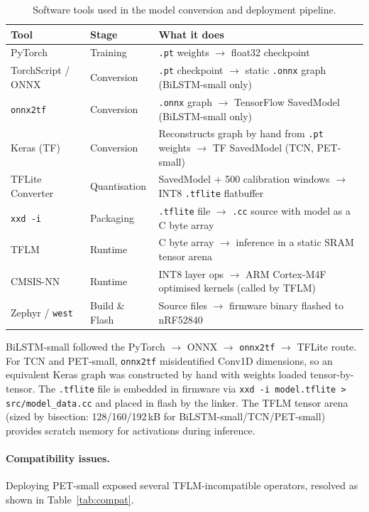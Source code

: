 \documentclass[11pt]{article}
\begin{document}
\begin{table}[H]
\centering
\caption{Software tools used in the model conversion and deployment pipeline.}
\label{tab:tools}
\small
\begin{tabular}{p{2.8cm}p{2.5cm}p{8cm}}
\toprule
\textbf{Tool} & \textbf{Stage} & \textbf{What it does} \\
\midrule
PyTorch & Training & \texttt{.pt} weights $\to$ float32 checkpoint \\
TorchScript / ONNX & Conversion & \texttt{.pt} checkpoint $\to$ static \texttt{.onnx} graph (BiLSTM-small only) \\
\texttt{onnx2tf} & Conversion & \texttt{.onnx} graph $\to$ TensorFlow SavedModel (BiLSTM-small only) \\
Keras (TF) & Conversion & Reconstructs graph by hand from \texttt{.pt} weights $\to$ TF SavedModel (TCN, PET-small) \\
TFLite Converter & Quantisation & SavedModel + 500 calibration windows $\to$ INT8 \texttt{.tflite} flatbuffer \\
\texttt{xxd -i} & Packaging & \texttt{.tflite} file $\to$ \texttt{.cc} source with model as a C byte array \\
TFLM & Runtime & C byte array $\to$ inference in a static SRAM tensor arena \\
CMSIS-NN & Runtime & INT8 layer ops $\to$ ARM Cortex-M4F optimised kernels (called by TFLM) \\
Zephyr / \texttt{west} & Build \& Flash & Source files $\to$ firmware binary flashed to nRF52840 \\
\bottomrule
\end{tabular}
\end{table}

\noindent
BiLSTM-small followed the PyTorch $\to$ ONNX $\to$ \texttt{onnx2tf} $\to$ TFLite route. For TCN and PET-small, \texttt{onnx2tf} misidentified Conv1D dimensions, so an equivalent Keras graph was constructed by hand with weights loaded tensor-by-tensor. The \texttt{.tflite} file is embedded in firmware via \texttt{xxd -i model.tflite > src/model\_data.cc} and placed in flash by the linker. The TFLM tensor arena (sized by bisection: 128/160/192\,kB for BiLSTM-small/TCN/PET-small) provides scratch memory for activations during inference.

\paragraph{Compatibility issues.}
Deploying PET-small exposed several TFLM-incompatible operators, resolved as shown in Table~\ref{tab:compat}.
\end{document}
